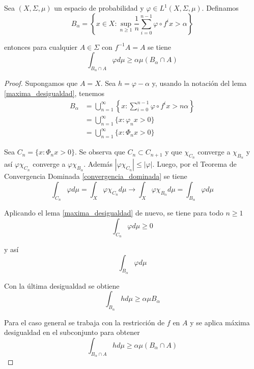 \begin{lema}\label{maxima_desigualdad_cor}
	Sea $(X,\Sigma,\mu)$ un espacio de probabilidad y $\varphi \in L^1(X,\Sigma,\mu)$. Definamos	
	\begin{equation}
		B_{\alpha} = \left\{ x \in X: \sup_{n \geq 1} \frac{1}{n} \sum_{i=0}^{n-1} \varphi \circ f^i x > \alpha \right\}
	\end{equation}
	
	entonces para cualquier $A \in \Sigma$ con $f^{-1}A=A$ se tiene	
	\begin{equation}
		\int_{B_{\alpha} \cap A} \varphi d\mu \geq \alpha \mu(B_{\alpha} \cap A)
	\end{equation}
\end{lema}

\begin{proof}
	Supongamos que $A=X$. Sea $h = \varphi - \alpha$ y, usando la notación del lema \ref{maxima_desigualdad}, tenemos
	\begin{align}
		B_{\alpha} &= \bigcup_{n=1}^{\infty} \left\{ x: \sum_{i=0}^{n-1} \varphi \circ f^i x > n \alpha \right\}\\
		&= \bigcup_{n=1}^{\infty} \{ x: \varphi_n x > 0 \}\\
		&= \bigcup_{n=1}^{\infty} \{ x: \varPhi_n x > 0 \}
	\end{align}
	
	Sea $C_n = \{ x: \varPhi_n x > 0 \}$. Se observa que $C_n \subset C_{n+1}$ y que $\chi_{C_n}$ converge a $\chi_{B_{\alpha}}$ y así $\varphi \chi_{C_n}$ converge a $\varphi \chi_{B_{\alpha}}$. Además $|\varphi \chi_{C_n}| \leq |\varphi|$. Luego, por el Teorema de Convergencia Dominada \ref{convergencia_dominada} se tiene
	\begin{equation}
		\int_{C_n} \varphi d\mu = \int_X \varphi \chi_{C_n} d\mu \rightarrow \int_X \varphi \chi_{B_{\alpha}} d\mu = \int_{B_{\alpha}} \varphi d\mu 
	\end{equation}
	
	Aplicando el lema \ref{maxima_desigualdad} de nuevo, se tiene para todo $n \geq 1$
	\begin{equation}
		\int_{C_n} \varphi d\mu \geq 0
	\end{equation}
	
	y así
	\begin{equation}
		\int_{B_{\alpha}} \varphi d\mu
	\end{equation}
	
	Con la última desigualdad se obtiene
	\begin{equation}
		\int_{B_{\alpha}} h d\mu \geq \alpha \mu B_{\alpha}
	\end{equation}
	
	Para el caso general se trabaja con la restricción de $f$ en $A$ y se aplica máxima desigualdad en el subconjunto para obtener
	\begin{equation}
		\int_{B_{\alpha} \cap A} h d\mu \geq \alpha \mu(B_{\alpha} \cap A)
	\end{equation}
\end{proof}

